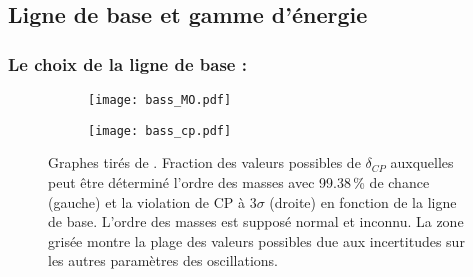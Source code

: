     \subsection{Ligne de base et gamme d'énergie}\label{sec::carac}

      \subsubsection{Le choix de la ligne de base :}
        
        \begin{figure}[htpb]
          \begin{subfigure}[t]{0.49\textwidth}
            \texttt{[image: bass\_MO.pdf]}
          \end{subfigure}\hfill
          \begin{subfigure}[t]{0.49\textwidth}
            \texttt{[image: bass\_cp.pdf]}
          \end{subfigure}
            \caption[Détermination de l'ordre des masses et de la violation de CP en fonction de la ligne de base]{\label{fig::bass_fig}Graphes tirés de \cite{Bass2013}. Fraction des valeurs possibles de $\delta_{CP}$ auxquelles peut être déterminé l'ordre des masses avec 99.38\,\% de chance (gauche) et la violation de CP à $3\sigma$ (droite) en fonction de la ligne de base. L'ordre des masses est supposé normal et inconnu. La zone grisée montre la plage des valeurs possibles due aux incertitudes sur les autres paramètres des oscillations.}
        \end{figure}
